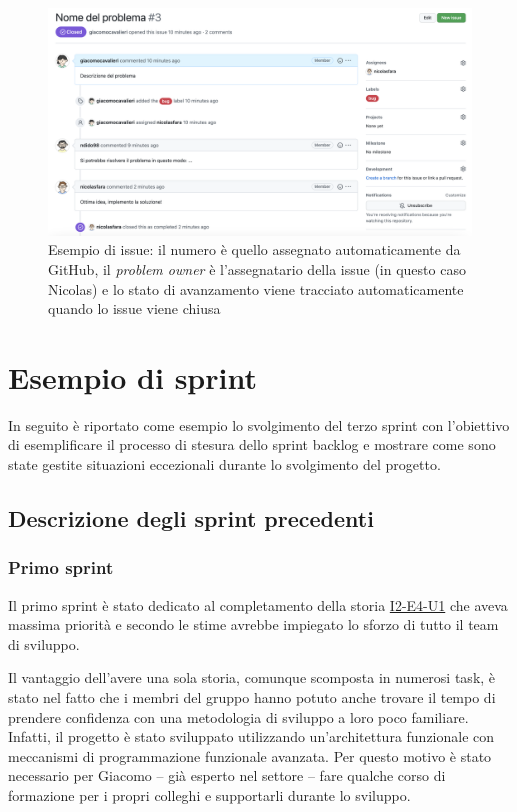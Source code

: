 \begin{figure}[htp]
  \centering
  \includegraphics[width=\textwidth]{images/issue-example.png}
  \caption{Esempio di issue: il numero è quello assegnato automaticamente da GitHub, il \emph{problem owner} è l'assegnatario della issue (in questo caso Nicolas) e lo stato di avanzamento viene tracciato automaticamente quando lo issue viene chiusa}
  \label{fig:issue-log}
\end{figure}

\section{Esempio di sprint}
In seguito è riportato come esempio lo svolgimento del terzo sprint con l'obiettivo di esemplificare il processo di stesura dello sprint backlog e mostrare come sono state gestite situazioni eccezionali durante lo svolgimento del progetto.

\subsection{Descrizione degli sprint precedenti}
\subsubsection{Primo sprint}
Il primo sprint è stato dedicato al completamento della storia \hyperref[user-story:i2-e4-u1]{I2-E4-U1} che aveva massima priorità e secondo le stime avrebbe impiegato lo sforzo di tutto il team di sviluppo.

Il vantaggio dell'avere una sola storia, comunque scomposta in numerosi task, è stato nel fatto che i membri del gruppo hanno potuto anche trovare il tempo di prendere confidenza con una metodologia di sviluppo a loro poco familiare. Infatti, il progetto è stato sviluppato utilizzando un'architettura funzionale con meccanismi di programmazione funzionale avanzata.
Per questo motivo è stato necessario per Giacomo -- già esperto nel settore -- fare qualche corso di formazione per i propri colleghi e supportarli durante lo sviluppo.

